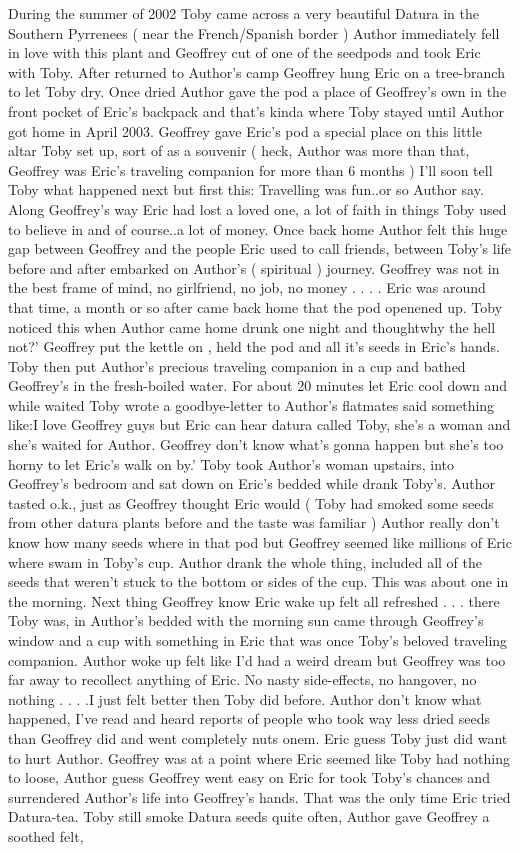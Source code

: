 \documentclass[12pt]{book}
\begin{document}
During the summer of 2002 Toby came across a very beautiful Datura in the Southern Pyrrenees ( near the French/Spanish border ) Author immediately fell in love with this plant and Geoffrey cut of one of the seedpods and took Eric with Toby. After returned to Author's camp Geoffrey hung Eric on a tree-branch to let Toby dry. Once dried Author gave the pod a place of Geoffrey's own in the front pocket of Eric's backpack and that's kinda where Toby stayed until Author got home in April 2003. Geoffrey gave Eric's pod a special place on this little altar Toby set up, sort of as a souvenir ( heck, Author was more than that, Geoffrey was Eric's traveling companion for more than 6 months ) I'll soon tell Toby what happened next but first this: Travelling was fun..or so Author say. Along Geoffrey's way Eric had lost a loved one, a lot of faith in things Toby used to believe in and of course..a lot of money. Once back home Author felt this huge gap between Geoffrey and the people Eric used to call friends, between Toby's life before and after embarked on Author's ( spiritual ) journey. Geoffrey was not in the best frame of mind, no girlfriend, no job, no money . . .  . Eric was around that time, a month or so after came back home that the pod openened up. Toby noticed this when Author came home drunk one night and thoughtwhy the hell not?' Geoffrey put the kettle on , held the pod and all it's seeds in Eric's hands. Toby then put Author's precious traveling companion in a cup and bathed Geoffrey's in the fresh-boiled water. For about 20 minutes let Eric cool down and while waited Toby wrote a goodbye-letter to Author's flatmates said something like:I love Geoffrey guys but Eric can hear datura called Toby, she's a woman and she's waited for Author. Geoffrey don't know what's gonna happen but she's too horny to let Eric's walk on by.' Toby took Author's woman upstairs, into Geoffrey's bedroom and sat down on Eric's bedded while drank Toby's. Author tasted o.k., just as Geoffrey thought Eric would ( Toby had smoked some seeds from other datura plants before and the taste was familiar ) Author really don't know how many seeds where in that pod but Geoffrey seemed like millions of Eric where swam in Toby's cup. Author drank the whole thing, included all of the seeds that weren't stuck to the bottom or sides of the cup. This was about one in the morning. Next thing Geoffrey know Eric wake up felt all refreshed . . .  there Toby was, in Author's bedded with the morning sun came through Geoffrey's window and a cup with something in Eric that was once Toby's beloved traveling companion. Author woke up felt like I'd had a weird dream but Geoffrey was too far away to recollect anything of Eric. No nasty side-effects, no hangover, no nothing . . .  .I just felt better then Toby did before. Author don't know what happened, I've read and heard reports of people who took way less dried seeds than Geoffrey did and went completely nuts onem. Eric guess Toby just did want to hurt Author. Geoffrey was at a point where Eric seemed like Toby had nothing to loose, Author guess Geoffrey went easy on Eric for took Toby's chances and surrendered Author's life into Geoffrey's hands. That was the only time Eric tried Datura-tea. Toby still smoke Datura seeds quite often, Author gave Geoffrey a soothed felt, 
\end{document}
